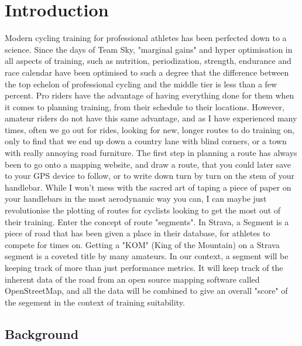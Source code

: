 \documentclass[11pt,a4paper]{report}
\begin{document}

\chapter{Introduction}
\label{chap:introduction}
Modern cycling training for professional athletes has been perfected down to a science. Since the days of Team Sky, "marginal gains" and hyper optimisation
in all aspects of training, such as nutrition, periodization, strength, endurance and race calendar have been optimised to such a degree that
the difference between the top echelon of professional cycling and the middle tier is less than a few percent. Pro riders have the advantage of
having everything done for them when it comes to planning training, from their schedule to their locations. However, amateur riders do not have this
same advantage, and as I have experienced many times, often we go out for rides, looking for new, longer routes to do training on, only to find
that we end up down a country lane with blind corners, or a town with really annoying road furniture. The first step in planning a route has always
been to go onto a mapping website, and draw a route, that you could later save to your GPS device to follow, or to write down turn by turn on the stem of your
handlebar. While I won't mess with the sacred art of taping a piece of paper on your handlebars in the most aerodynamic way you can, I can maybe
just revolutionise the plotting of routes for cyclists looking to get the most out of their training. Enter the concept of route "segments". In Strava,
a Segment is a piece of road that has been given a place in their database, for athletes to compete for times on. Getting a "KOM" (King of the Mountain) on
a Strava segment is a coveted title by many amateurs. In our context, a segment will be keeping track of more than just performance metrics. It will
keep track of the inherent data of the road from an open source mapping software called OpenStreetMap, and all the data will be combined to give
an overall "score" of the segement in the context of training suitability.
\section{Background}
\end{document}
